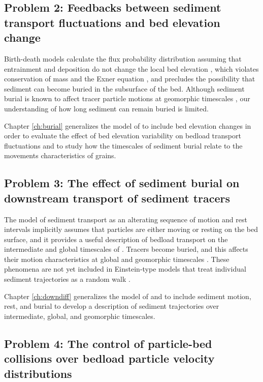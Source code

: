 \subsection{Problem 2: Feedbacks between sediment transport fluctuations and bed elevation change}

Birth-death models calculate the flux probability distribution assuming that entrainment and deposition do not change the local bed elevation \citep{Ancey2008,Heyman2013,Ancey2014}, which violates conservation of mass and the Exner equation \citep{Exner1925,Tsujimoto1976}, and precludes the possibility that sediment can become buried in the subsurface of the bed.
Although sediment burial is known to affect tracer particle motions at geomorphic timescales \citep{Ferguson2012,Hassan2017}, our understanding of how long sediment can remain buried is limited.

Chapter \ref{ch:burial} generalizes the model of \citet{Ancey2008} to include bed elevation changes in order to evaluate the effect of bed elevation variability on bedload transport fluctuations and to study how the timescales of sediment burial relate to the movements characteristics of grains.

\subsection{Problem 3: The effect of sediment burial on downstream transport of sediment tracers}

The model of sediment transport as an alterating sequence of motion and rest intervals implicitly assumes that particles are either moving or resting on the bed surface, and it provides a useful description of bedload transport on the intermediate and global timescales of \citet{Nikora2001,Nikora2002}.
Tracers become buried, and this affects their motion characteristics at global and geomorphic timescales \citep{Hassan2017}. These phenomena are not yet included in Einstein-type models that treat individual sediment trajectories as a random walk \citep[e.g.][]{Lisle1998}.

Chapter \ref{ch:downdiff} generalizes the model of \citet{Lisle1998} and \citet{Lajeunesse2018} to include sediment motion, rest, and burial to develop a description of sediment trajectories over intermediate, global, and geomorphic timescales.

\subsection{Problem 4: The control of particle-bed collisions over bedload particle velocity distributions}

